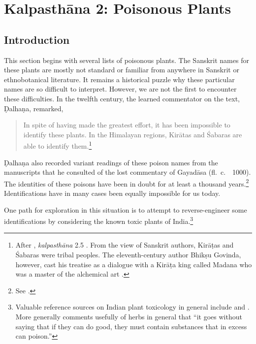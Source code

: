\newcommand{\plant}[4]{#1 (\emph{#2})\footnoteA{#3; see #4}}
\let\chemical = \plant
\newcommand{\skt}[2]{#1 (\emph{#2})}
\newcommand{\sskt}[2]{\empty}
%

\chapter{Kalpasthāna 2: Poisonous Plants}

\section{Introduction}

This section begins with several lists of poisonous plants.  The
Sanskrit names for these plants are mostly not standard or familiar
from anywhere in Sanskrit or ethnobotanical literature.  It remains a
historical puzzle why these particular names are so difficult to
interpret. However, we are not the first to encounter these
difficulties. In the twelfth century, the learned commentator on the
text, Ḍalhaṇa, remarked,
\begin{quote}
In spite of having made the greatest effort, it has been impossible to
identify these plants. In the Himalayan regions, Kirātas and Śabaras
are able to identify them.\footnote{After \SS, \emph{kalpasthāna} 2.5
    \citep[564]{vulgate}. From the view of Sanskrit authors, Kirāṭas and
    Śabaras were tribal peoples.  The eleventh-century author Bhikṣu
    Govinda, however, cast his treatise as a dialogue with a Kirāṭa king
    called Madana who was a master of the alchemical art \citep[IIA,
    620]{meul-hist}.}
\end{quote}
Ḍalhaṇa also recorded variant readings of these poison names from the
manuscripts that he consulted of the lost commentary of Gayadāsa (fl.\
c.\ \AD\ 1000). The identities of these poisons have been in doubt for
at least a thousand years.\footnote{See \cite[80--81]{wuja-2003}.} 
    Identifications have in many cases been equally impossible for us
    today.

One path for exploration in this situation is to attempt to
reverse-engineer some identifications by considering the known toxic
plants of India.\footnote{Valuable reference sources on Indian plant
    toxicology in general include \cite[chs.\,10, 11]{pill-2013} and
    \cite[parts 1.II, 3 and 4]{barc-2008}. More generally \citet[41 et
    passim]{down} comments usefully of herbs in general that “it goes
    without saying that if they can do good, they must contain substances
    that in excess can poison.”}


